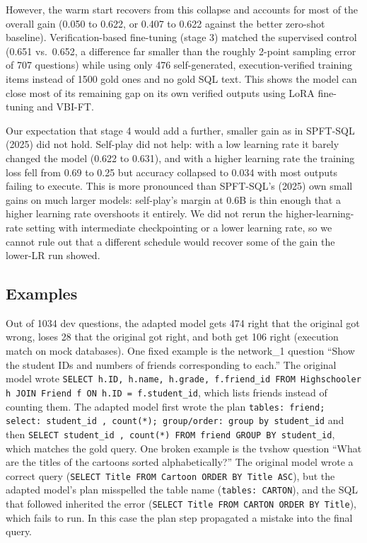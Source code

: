 However, the warm start recovers from this collapse and accounts for most of the overall gain (0.050 to 0.622, or 0.407 to 0.622 against the better zero-shot baseline). Verification-based fine-tuning (stage 3) matched the supervised control (0.651 vs.\ 0.652, a difference far smaller than the roughly 2-point sampling error of 707 questions) while using only 476 self-generated, execution-verified training items instead of 1500 gold ones and no gold SQL text. This shows the model can close most of its remaining gap on its own verified outputs using LoRA fine-tuning and VBI-FT.


Our expectation that stage 4 would add a further, smaller gain as in SPFT-SQL (2025) did not hold. Self-play did not help: with a low learning rate it barely changed the model (0.622 to 0.631), and with a higher learning rate the training loss fell from 0.69 to 0.25 but accuracy collapsed to 0.034 with most outputs failing to execute. This is more pronounced than SPFT-SQL's (2025) own small gains on much larger models: self-play's margin at 0.6B is thin enough that a higher learning rate overshoots it entirely. We did not rerun the higher-learning-rate setting with intermediate checkpointing or a lower learning rate, so we cannot rule out that a different schedule would recover some of the gain the lower-LR run showed.

\subsection{Examples}
\label{sec:rq3-examples}

Out of 1034 dev questions, the adapted model gets 474 right that the original got wrong, loses 28 that the original got right, and both get 106 right (execution match on mock databases). One fixed example is the network\_1 question ``Show the student IDs and numbers of friends corresponding to each.'' The original model wrote \texttt{SELECT h.ID, h.name, h.grade, f.friend\_id FROM Highschooler h JOIN Friend f ON h.ID = f.student\_id}, which lists friends instead of counting them. The adapted model first wrote the plan \texttt{tables: friend; select: student\_id , count(*); group/order: group by student\_id} and then \texttt{SELECT student\_id , count(*) FROM friend GROUP BY student\_id}, which matches the gold query. One broken example is the tvshow question ``What are the titles of the cartoons sorted alphabetically?'' The original model wrote a correct query (\texttt{SELECT Title FROM Cartoon ORDER BY Title ASC}), but the adapted model's plan misspelled the table name (\texttt{tables: CARTON}), and the SQL that followed inherited the error (\texttt{SELECT Title FROM CARTON ORDER BY Title}), which fails to run. In this case the plan step propagated a mistake into the final query.

